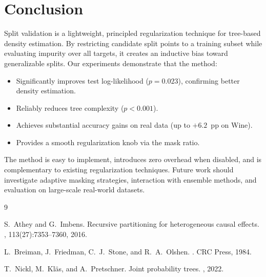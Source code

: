 \documentclass[11pt,a4paper]{article}
\begin{document}
\section{Conclusion}
\label{sec:conclusion}

Split validation is a lightweight, principled regularization technique for
tree-based density estimation. By restricting candidate split points to a
training subset while evaluating impurity over all targets, it creates an
inductive bias toward generalizable splits. Our experiments demonstrate that
the method:
\begin{itemize}
    \item Significantly improves test log-likelihood ($p = 0.023$), confirming
          better density estimation.
    \item Reliably reduces tree complexity ($p < 0.001$).
    \item Achieves substantial accuracy gains on real data (up to $+6.2$~pp on
          Wine).
    \item Provides a smooth regularization knob via the mask ratio.
\end{itemize}

The method is easy to implement, introduces zero overhead when disabled, and
is complementary to existing regularization techniques. Future work should
investigate adaptive masking strategies, interaction with ensemble methods, and
evaluation on large-scale real-world datasets.


\begin{thebibliography}{9}

S.~Athey and G.~Imbens.
\newblock Recursive partitioning for heterogeneous causal effects.
,
  113(27):7353--7360, 2016.

L.~Breiman, J.~Friedman, C.~J.~Stone, and R.~A.~Olshen.
.
\newblock CRC Press, 1984.

T.~Nickl, M.~Kl\"as, and A.~Pretschner.
\newblock Joint probability trees.
, 2022.

\end{thebibliography}
\end{document}
